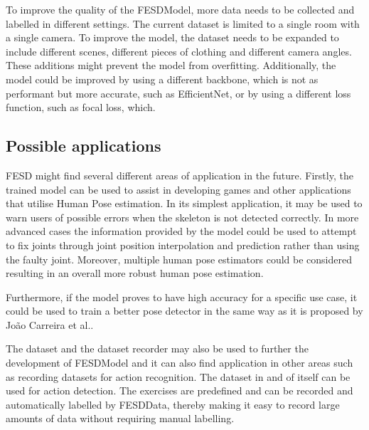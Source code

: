 To improve the quality of the FESDModel, more data needs to be collected and labelled in different settings. The current dataset is limited to a single room with a single camera. To improve the model, the dataset needs to be expanded to include different scenes, different pieces of clothing and different camera angles. These additions might prevent the model from overfitting. Additionally, the model could be improved by using a different backbone, which is not as performant but more accurate, such as EfficientNet, or by using a different loss function, such as focal loss, which.

\subsection{Possible applications}

FESD might find several different areas of application in the future. Firstly, the trained model can be used to assist in developing games and other applications that utilise Human Pose estimation. In its simplest application, it may be used to warn users of possible errors when the skeleton is not detected correctly. In more advanced cases the information provided by the model could be used to attempt to fix joints through joint position interpolation and prediction rather than using the faulty joint. Moreover, multiple human pose estimators could be considered resulting in an overall more robust human pose estimation.

Furthermore, if the model proves to have high accuracy for a specific use case, it could be used to train a better pose detector in the same way as it is proposed by Jo\~ao Carreira et al.\cite{IterativeErrorFeedback}.

The dataset and the dataset recorder may also be used to further the development of FESDModel and it can also find application in other areas such as recording datasets for action recognition. The dataset in and of itself can be used for action detection. The exercises are predefined and can be recorded and automatically labelled by FESDData, thereby making it easy to record large amounts of data without requiring manual labelling.